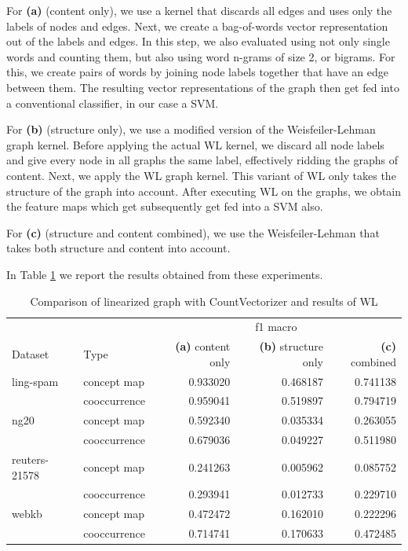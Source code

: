 For \textbf{(a)} (content only), we use a kernel that discards all edges and uses only the labels of nodes and edges. Next, we create a bag-of-words vector representation out of the labels and edges.
In this step, we also evaluated using not only single words and counting them, but also using word n-grams of size 2, or bigrams.
For this, we create pairs of words by joining node labels together that have an edge between them.
The resulting vector representations of the graph then get fed into a conventional classifier, in our case a SVM.

For \textbf{(b)} (structure only), we use a modified version of the Weisfeiler-Lehman graph kernel. Before applying the actual WL kernel, we discard all node labels and give every node in all graphs the same label, effectively ridding the graphs of content. Next, we apply the WL graph kernel. This variant of WL only takes the structure of the graph into account.
After executing WL on the graphs, we obtain the feature maps which get subsequently get fed into a SVM also.

For \textbf{(c)} (structure and content combined), we use the Weisfeiler-Lehman that takes both structure and content into account.

In Table \ref{table:table_results_structure_vs_content} we report the results obtained from these experiments.

\begin{table}[htb!]
\centering
\begin{tabular}{llrrr}
          & & \multicolumn{3}{c}{f1 macro} \\
Dataset & Type & \textbf{(a)} content only & \textbf{(b)} structure only & \textbf{(c)} combined\\
\midrule
ling-spam & concept map &  0.933020 &  0.468187 &  0.741138 \\
          & cooccurrence &  0.959041 &  0.519897 &  0.794719 \\
\midrule
ng20 & concept map &  0.592340 &  0.035334 &  0.263055 \\
          & cooccurrence &  0.679036 &  0.049227 &  0.511980 \\
\midrule
reuters-21578 & concept map &  0.241263 &  0.005962 &  0.085752 \\
          & cooccurrence &  0.293941 &  0.012733 &  0.229710 \\
\midrule
webkb & concept map &  0.472472 &  0.162010 &  0.222296 \\
          & cooccurrence &  0.714741 &  0.170633 &  0.472485 \\
\bottomrule
\end{tabular}
\caption[Results: Linearized vs. WL]{Comparison of linearized graph with CountVectorizer and results of WL}\label{table:table_results_structure_vs_content}
\end{table}

